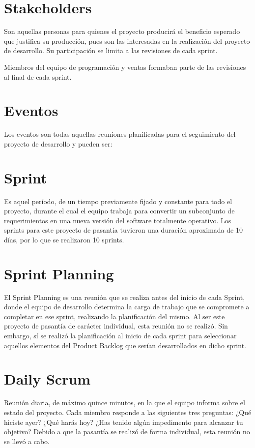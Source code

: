 \section{Stakeholders}
Son aquellas personas para quienes el proyecto producirá el beneficio esperado que justifica su producción, pues son las interesadas en la realización del proyecto de desarrollo. Su participación se limita a las revisiones de cada sprint.

Miembros del equipo de programación y ventas formaban parte de las revisiones al final de cada sprint.

\section{Eventos}
Los eventos son todas aquellas reuniones planificadas para el seguimiento del proyecto de desarrollo y pueden ser:

\section{Sprint}
Es aquel período, de un tiempo previamente fijado y constante para todo el proyecto, durante el cual el equipo trabaja para convertir un subconjunto de requerimientos en una nueva versión del software totalmente operativo. Los sprints para este proyecto de pasantía tuvieron una duración aproximada de 10 días, por lo que se realizaron 10 sprints.

\section{Sprint Planning}
El Sprint Planning es una reunión que se realiza antes del inicio de cada Sprint, donde el equipo de desarrollo determina la carga de trabajo que se compromete a completar en ese sprint, realizando la planificación del mismo. Al ser este proyecto de pasantía de carácter individual, esta reunión no se realizó. Sin embargo, sí se realizó la planificación al inicio de cada sprint para seleccionar aquellos elementos del Product Backlog que serían desarrollados en dicho sprint.

\section{Daily Scrum}
Reunión diaria, de máximo quince minutos, en la que el equipo informa sobre el estado del proyecto. Cada miembro responde a las siguientes tres preguntas:
¿Qué hiciste ayer?
¿Qué harás hoy?
¿Has tenido algún impedimento para alcanzar tu objetivo?
Debido a que la pasantía se realizó de forma individual, esta reunión no se llevó a cabo.

